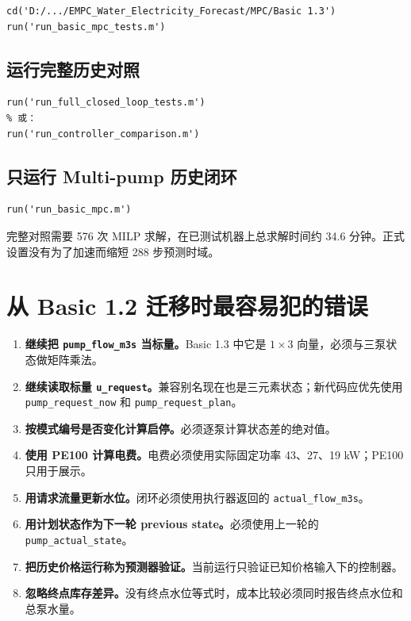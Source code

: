 \documentclass[UTF8,a4paper,11pt]{ctexart}
\newcommand{\code}[1]{\texttt{#1}}
\begin{document}
\begin{lstlisting}
cd('D:/.../EMPC_Water_Electricity_Forecast/MPC/Basic 1.3')
run('run_basic_mpc_tests.m')
\end{lstlisting}

\subsection{运行完整历史对照}

\begin{lstlisting}
run('run_full_closed_loop_tests.m')
% 或：
run('run_controller_comparison.m')
\end{lstlisting}

\subsection{只运行 Multi-pump 历史闭环}

\begin{lstlisting}
run('run_basic_mpc.m')
\end{lstlisting}

完整对照需要 576 次 MILP 求解，在已测试机器上总求解时间约 34.6 分钟。正式设置没有为了加速而缩短 288 步预测时域。

\section{从 Basic 1.2 迁移时最容易犯的错误}

\begin{enumerate}
  \item \textbf{继续把 \code{pump\_flow\_m3s} 当标量。}Basic 1.3 中它是 $1\times3$ 向量，必须与三泵状态做矩阵乘法。
  \item \textbf{继续读取标量 \code{u\_request}。}兼容别名现在也是三元素状态；新代码应优先使用 \code{pump\_request\_now} 和 \code{pump\_request\_plan}。
  \item \textbf{按模式编号是否变化计算启停。}必须逐泵计算状态差的绝对值。
  \item \textbf{使用 PE100 计算电费。}电费必须使用实际固定功率 43、27、19 kW；PE100 只用于展示。
  \item \textbf{用请求流量更新水位。}闭环必须使用执行器返回的 \code{actual\_flow\_m3s}。
  \item \textbf{用计划状态作为下一轮 previous state。}必须使用上一轮的 \code{pump\_actual\_state}。
  \item \textbf{把历史价格运行称为预测器验证。}当前运行只验证已知价格输入下的控制器。
  \item \textbf{忽略终点库存差异。}没有终点水位等式时，成本比较必须同时报告终点水位和总泵水量。
\end{enumerate}
\end{document}
